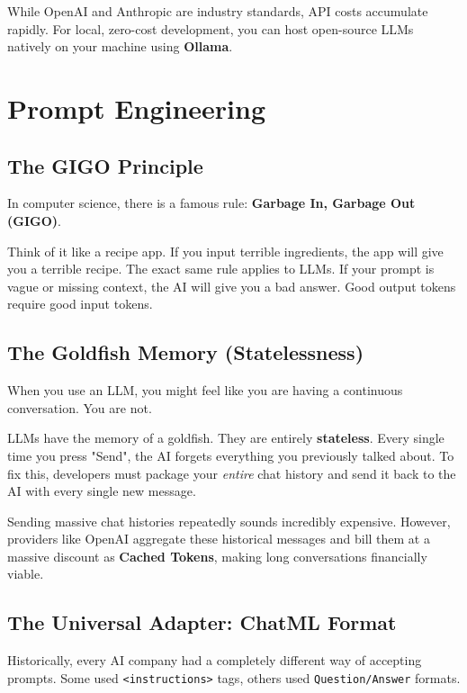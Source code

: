 \documentclass[12pt,a4paper,oneside]{book}
\begin{document}
\begin{tipbox}
	While OpenAI and Anthropic are industry standards, API costs accumulate rapidly. For local, zero-cost development, you can host open-source LLMs natively on your machine using \textbf{Ollama}.
\end{tipbox}

\chapter{Prompt Engineering}

\section{The GIGO Principle}
In computer science, there is a famous rule: \textbf{Garbage In, Garbage Out (GIGO)}.

Think of it like a recipe app. If you input terrible ingredients, the app will give you a terrible recipe. The exact same rule applies to LLMs. If your prompt is vague or missing context, the AI will give you a bad answer. Good output tokens require good input tokens.

\section{The Goldfish Memory (Statelessness)}
When you use an LLM, you might feel like you are having a continuous conversation. You are not.

LLMs have the memory of a goldfish. They are entirely \textbf{stateless}. Every single time you press "Send", the AI forgets everything you previously talked about. To fix this, developers must package your \textit{entire} chat history and send it back to the AI with every single new message.

\begin{infobox}
	Sending massive chat histories repeatedly sounds incredibly expensive. However, providers like OpenAI aggregate these historical messages and bill them at a massive discount as \textbf{Cached Tokens}, making long conversations financially viable.
\end{infobox}

\section{The Universal Adapter: ChatML Format}
Historically, every AI company had a completely different way of accepting prompts. Some used \texttt{<instructions>} tags, others used \texttt{Question/Answer} formats.
\end{document}
